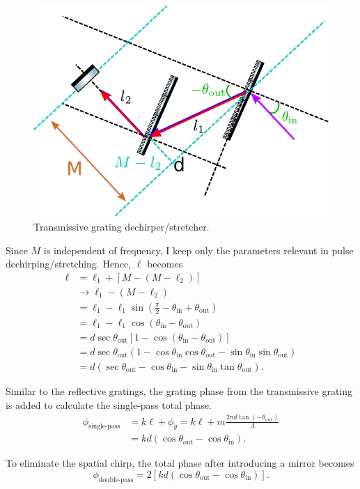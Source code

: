 \documentclass[12pt,hidelinks]{book}
\begin{document}
\begin{figure}[htbp]
\centering
\includegraphics[width=0.5\linewidth]{transmission grating.pdf}
\caption{Transmissive grating dechirper/stretcher.}
\label{fig:TGC}
\end{figure}


Since $M$ is independent of frequency, I keep only the parameters relevant in pulse dechirping/stretching. Hence, $\ell$ becomes
\begin{align}
\ell & =\ell_1+\left[M-\left(M-\ell_2\right)\right] \nonumber \\
& \rightarrow \ell_1-\left(M-\ell_2\right) \nonumber \\
& =\ell_1-\ell_1\sin\left(\frac{\pi}{2}-\theta_{\text{in}}+\theta_{\text{out}}\right) \nonumber \\
& =\ell_1-\ell_1\cos\left(\theta_{\text{in}}-\theta_{\text{out}}\right) \nonumber \\
& =d\sec\theta_{\text{out}}\left[1-\cos(\theta_{\text{in}}-\theta_{\text{out}})\right] \nonumber \\
& =d\sec\theta_{\text{out}}\left(1-\cos\theta_{\text{in}}\cos\theta_{\text{out}}-\sin\theta_{\text{in}}\sin\theta_{\text{out}}\right) \nonumber \\
& =d\left(\sec\theta_{\text{out}}-\cos\theta_{\text{in}}-\sin\theta_{\text{in}}\tan\theta_{\text{out}}\right).
\end{align}

Similar to the reflective gratings, the grating phase from the transmissive grating is added to calculate the single-pass total phase.
\begin{align}
\phi_{\text{single-pass}} & =k\ell+\phi_g=k\ell+m\frac{2\pi d\tan(-\theta_{\text{out}})}{\Lambda} \nonumber \\
& =kd\left(\cos\theta_{\text{out}}-\cos\theta_{\text{in}}\right).
\end{align}

To eliminate the spatial chirp, the total phase after introducing a mirror becomes
\begin{equation}
\phi_{\text{double-pass}}=2\left[kd\left(\cos\theta_{\text{out}}-\cos\theta_{\text{in}}\right)\right].
\end{equation}
\end{document}
